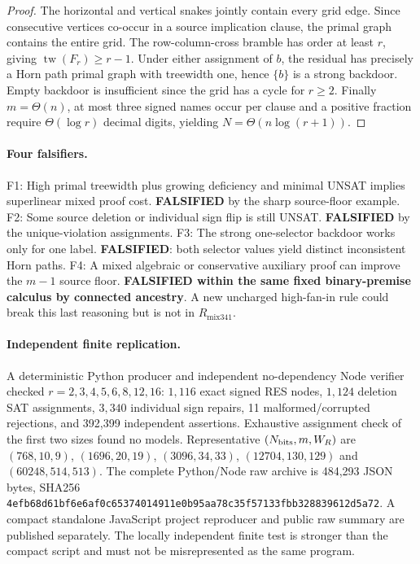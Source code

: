 \documentclass[11pt]{article}
\begin{document}
\begin{proof}
The horizontal and vertical snakes jointly contain every grid edge. Since consecutive vertices co-occur in a source implication clause, the primal graph contains the entire grid. The row-column-cross bramble has order at least $r$, giving $\operatorname{tw}(F_r)\ge r-1$. Under either assignment of $b$, the residual has precisely a Horn path primal graph with treewidth one, hence $\{b\}$ is a strong backdoor. Empty backdoor is insufficient since the grid has a cycle for $r\ge2$. Finally $m=\Theta(n)$, at most three signed names occur per clause and a positive fraction require $\Theta(\log r)$ decimal digits, yielding $N=\Theta(n\log(r+1))$.
\end{proof}

\paragraph{Four falsifiers.}
\noindent F1: High primal treewidth plus growing deficiency and minimal UNSAT implies superlinear mixed proof cost. \textbf{FALSIFIED} by the sharp source-floor example. F2: Some source deletion or individual sign flip is still UNSAT. \textbf{FALSIFIED} by the unique-violation assignments. F3: The strong one-selector backdoor works only for one label. \textbf{FALSIFIED}: both selector values yield distinct inconsistent Horn paths. F4: A mixed algebraic or conservative auxiliary proof can improve the $m-1$ source floor. \textbf{FALSIFIED within the same fixed binary-premise calculus by connected ancestry}. A new uncharged high-fan-in rule could break this last reasoning but is not in $R_{\mathrm{mix341}}$.

\paragraph{Independent finite replication.}
A deterministic Python producer and independent no-dependency Node verifier checked $r=2,3,4,5,6,8,12,16$: $1{,}116$ exact signed RES nodes, $1{,}124$ deletion SAT assignments, $3{,}340$ individual sign repairs, 11 malformed/corrupted rejections, and 392,399 independent assertions. Exhaustive assignment check of the first two sizes found no models. Representative $(N_{\rm bits},m,W_R)$ are $(768,10,9)$, $(1696,20,19)$, $(3096,34,33)$, $(12704,130,129)$ and $(60248,514,513)$. The complete Python/Node raw archive is 484,293 JSON bytes, SHA256 \texttt{4efb68d61bf6e6af0c65374014911e0b95aa78c35f57133fbb328839612d5a72}. A compact standalone JavaScript project reproducer and public raw summary are published separately. The locally independent finite test is stronger than the compact script and must not be misrepresented as the same program.
\end{document}
